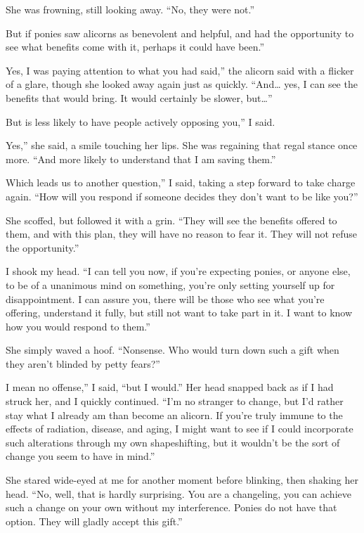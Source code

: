 She was frowning, still looking away. “No, they were not.”

\leavevmode{}But if ponies saw alicorns as benevolent and helpful, and had the opportunity to see what benefits come with it, perhaps it could have been.”

\leavevmode{}Yes, I was paying attention to what you had said,” the alicorn said with a flicker of a glare, though she looked away again just as quickly. “And… yes, I can see the benefits that would bring. It would certainly be slower, but…”

\leavevmode{}But is less likely to have people actively opposing you,” I said.

\leavevmode{}Yes,” she said, a smile touching her lips. She was regaining that regal stance once more. “And more likely to understand that I am saving them.”

\leavevmode{}Which leads us to another question,” I said, taking a step forward to take charge again. “How will you respond if someone decides they don’t want to be like you?”

She scoffed, but followed it with a grin. “They will see the benefits offered to them, and with this plan, they will have no reason to fear it. They will not refuse the opportunity.”

I shook my head. “I can tell you now, if you’re expecting ponies, or anyone else, to be of a unanimous mind on something, you’re only setting yourself up for disappointment. I can assure you, there will be those who see what you’re offering, understand it fully, but still not want to take part in it. I want to know how you would respond to them.”

She simply waved a hoof. “Nonsense. Who would turn down such a gift when they aren’t blinded by petty fears?”

\leavevmode{}I mean no offense,” I said, “but I would.” Her head snapped back as if I had struck her, and I quickly continued. “I’m no stranger to change, but I’d rather stay what I already am than become an alicorn. If you’re truly immune to the effects of radiation, disease, and aging, I might want to see if I could incorporate such alterations through my own shapeshifting, but it wouldn’t be the sort of change you seem to have in mind.”

She stared wide-eyed at me for another moment before blinking, then shaking her head. “No, well, that is hardly surprising. You are a changeling, you can achieve such a change on your own without my interference. Ponies do not have that option. They will gladly accept this gift.”

